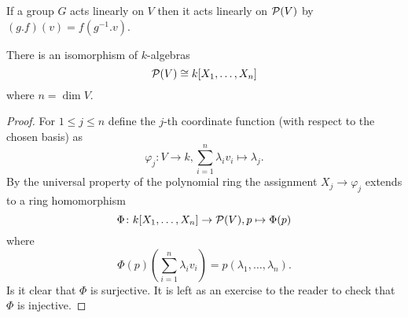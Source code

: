 \begin{rem}
 If a group $G$ acts linearly on $V$ then it acts linearly on $\mathcal{P}(V)$ by $(g.f)(v) = f\left(g^{-1}.v\right)$.
\end{rem}


\begin{lem}
 There is an isomorphism of $k$-algebras
 \[
  \mathcal{P}(V) \cong k[X_1, \dotsc, X_n]
 \]
 where $n = \dim V$.
\end{lem}
\begin{proof}
 For $1 \leq j \leq n$ define the $j$-th coordinate function (with respect to the chosen basis) as
 \[
  \varphi_j \colon V \to k, \sum_{i=1}^n \lambda_i v_i \mapsto \lambda_j.
 \]
 By the universal property of the polynomial ring the assignment $X_j \to \varphi_j$ extends to a ring homomorphism
 \[
  \Phi \colon k[X_1, \dotsc, X_n] \to \mathcal{P}(V), p \mapsto \Phi(p)
 \]
 where
 \[
  \Phi(p)\left(\sum_{i=1}^n \lambda_i v_i\right) = p(\lambda_1, \dotsc, \lambda_n).
 \]
 Is it clear that $\Phi$ is surjective. It is left as an exercise to the reader to check that $\Phi$ is injective.
\end{proof}



